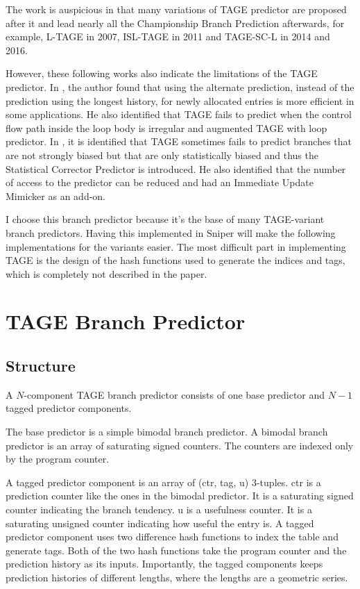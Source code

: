 \documentclass[screen,nonacm]{acmart}
\begin{document}

The work is auspicious in that many variations of TAGE predictor are proposed after it and lead nearly all the Championship Branch Prediction afterwards, for example, L-TAGE\cite{Seznec07jilp} in 2007, ISL-TAGE\cite{Seznec11hal} in 2011 and TAGE-SC-L\cite{Seznec14hal,Seznec16hal} in 2014 and 2016.

However, these following works also indicate the limitations of the TAGE predictor.
In \cite{Seznec07jilp}, the author found that using the alternate prediction, instead of the prediction using the longest history, for newly allocated entries is more efficient in some applications.
He also identified that TAGE fails to predict when the control flow path inside the loop body is irregular and augmented TAGE with loop predictor.
In \cite{Seznec11hal}, it is identified that TAGE sometimes fails to predict branches that are not strongly biased but that are only statistically biased and thus the Statistical Corrector Predictor is introduced.
He also identified that the number of access to the predictor can be reduced and had an Immediate Update Mimicker as an add-on.

I choose this branch predictor because it's the base of many TAGE-variant branch predictors.
Having this implemented in Sniper will make the following implementations for the variants easier.
The most difficult part in implementing TAGE is the design of the hash functions used to generate the indices and tags,
which is completely not described in the paper.

\section{TAGE Branch Predictor}

\subsection{Structure}

A \(N\)-component TAGE branch predictor consists of one base predictor and \(N-1\) tagged predictor components.

The base predictor is a simple bimodal branch predictor.
A bimodal branch predictor is an array of saturating signed counters.
The counters are indexed only by the program counter.

A tagged predictor component is an array of \textsf{(ctr, tag, u)} 3-tuples.
\textsf{ctr} is a prediction counter like the ones in the bimodal predictor.
It is a saturating signed counter indicating the branch tendency.
\textsf{u} is a usefulness counter.
It is a saturating unsigned counter indicating how useful the entry is.
A tagged predictor component uses two difference hash functions to index the table
and generate tags.
Both of the two hash functions take the program counter and the prediction history as its inputs.
Importantly, the tagged components keeps prediction histories of different lengths,
where the lengths are a geometric series.
\end{document}
